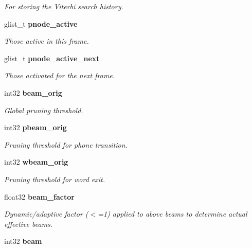 \begin{DoxyCompactItemize}
\begin{DoxyCompactList}\small\item\em For storing the Viterbi search history. \end{DoxyCompactList}\item 
glist\-\_\-t {\bf pnode\-\_\-active}\label{structfsg__search__s_a318ff42978c1e645f01962345ac08215}

\begin{DoxyCompactList}\small\item\em Those active in this frame. \end{DoxyCompactList}\item 
glist\-\_\-t {\bf pnode\-\_\-active\-\_\-next}\label{structfsg__search__s_aa2dfc00e1f34041dacd9572b0d659775}

\begin{DoxyCompactList}\small\item\em Those activated for the next frame. \end{DoxyCompactList}\item 
int32 {\bf beam\-\_\-orig}\label{structfsg__search__s_a0cdf7dc3d3eed0d37f46cb71fdea206e}

\begin{DoxyCompactList}\small\item\em Global pruning threshold. \end{DoxyCompactList}\item 
int32 {\bf pbeam\-\_\-orig}\label{structfsg__search__s_a7cdf0ab2591b95d89940d51e3ab01529}

\begin{DoxyCompactList}\small\item\em Pruning threshold for phone transition. \end{DoxyCompactList}\item 
int32 {\bf wbeam\-\_\-orig}\label{structfsg__search__s_a7f3ecc2f769143e42ed958744478db3c}

\begin{DoxyCompactList}\small\item\em Pruning threshold for word exit. \end{DoxyCompactList}\item 
float32 {\bf beam\-\_\-factor}
\begin{DoxyCompactList}\small\item\em Dynamic/adaptive factor ($<$=1) applied to above beams to determine actual effective beams. \end{DoxyCompactList}\item 
int32 {\bfseries beam}\label{structfsg__search__s_a1dbc28682f610fef5b79fd8a182f4395}


\end{DoxyCompactItemize}
